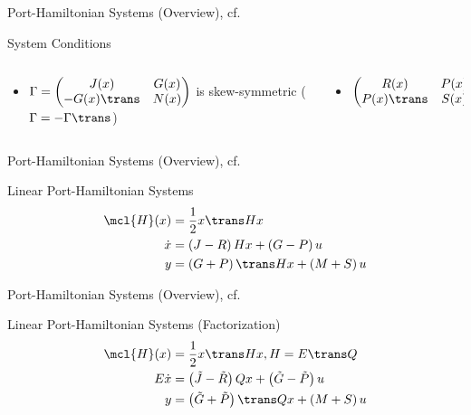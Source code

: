 \begin{frame}{Port-Hamiltonian Systems (Overview), cf.~\cite{VanDerSchaft2014}}
{\begin{block}{System Conditions}
            \begin{columns}[totalwidth=\linewidth]
                \begin{column}{.64\linewidth}
                    \begin{itemize}
                        \item $\Gamma = \begin{pmatrix}
                            J(x)  & G(x) \\
                            -G(x)\trans & N(x)
                        \end{pmatrix}$ is skew-symmetric ($\Gamma = -\Gamma\trans$)
                    \end{itemize}
                \end{column}
                \begin{column}{.34\linewidth}
                    \begin{itemize}
                        \item $\begin{pmatrix}
                            R(x)  & P(x) \\
                            P(x)\trans & S(x)
                        \end{pmatrix} \succcurlyeq 0$
                    \end{itemize}
                \end{column}
            \end{columns}
        \end{block}
    }
\end{frame}

\begin{frame}{Port-Hamiltonian Systems (Overview), cf.~\cite{VanDerSchaft2014}}
    \begin{block}{Linear Port-Hamiltonian Systems}
        \begin{align*}
            \mcl{H}(x) &= \frac{1}{2} x\trans H x \\
            \dot{x} &= \left( J - R \right) H x + \left( G - P \right) u \\
            y &= \left( G + P \right)\trans H x + \left( M + S \right) u
        \end{align*}
    \end{block}
\end{frame}

\begin{frame}{Port-Hamiltonian Systems (Overview), cf.~\cite{Morandin2022}}
    \begin{block}{Linear Port-Hamiltonian Systems (Factorization)}
        \begin{align*}
            \mcl{H}(x) &= \frac{1}{2} x\trans H x, H = E\trans Q \\
            E \dot{x} &= \left( \tilde{J} - \tilde{R} \right) Q x + \left( \tilde{G} - \tilde{P} \right) u \\
            y &= \left( \tilde{G} + \tilde{P} \right)\trans Q x + \left( M + S \right) u
        \end{align*}
    \end{block}
\end{frame}

